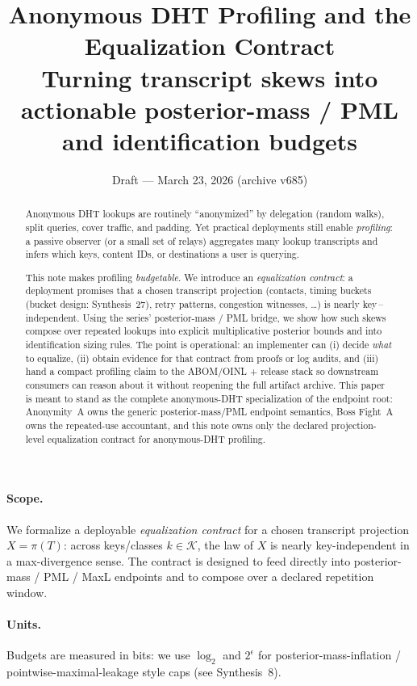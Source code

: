\documentclass[11pt]{article}
\title{Anonymous DHT Profiling and the Equalization Contract\\
\large Turning transcript skews into actionable posterior-mass / PML and identification budgets}
\author{}
\date{Draft --- March 23, 2026 (archive v685)}
\begin{document}
\maketitle

\begin{abstract}
Anonymous DHT lookups are routinely ``anonymized'' by delegation (random walks), split queries, cover traffic, and padding.
Yet practical deployments still enable \emph{profiling}: a passive observer (or a small set of relays) aggregates many lookup transcripts and infers which keys, content IDs, or destinations a user is querying.

This note makes profiling \emph{budgetable}.
We introduce an \emph{equalization contract}: a deployment promises that a chosen transcript projection (contacts, timing buckets (bucket design: Synthesis~27)\cite{series:bucketdesign}, retry patterns, congestion witnesses, \dots) is nearly key\,--\,independent.
Using the series' posterior-mass / PML bridge, we show how such skews compose over repeated lookups into explicit multiplicative posterior bounds and into identification sizing rules.
The point is operational: an implementer can (i) decide \emph{what} to equalize, (ii) obtain evidence for that contract from proofs or log audits, and (iii) hand a compact profiling claim to the ABOM/OINL + release stack so downstream consumers can reason about it without reopening the full artifact archive.
This paper is meant to stand as the complete anonymous-DHT specialization of the endpoint root: Anonymity~A owns the generic posterior-mass/PML endpoint semantics, Boss Fight~A owns the repeated-use accountant, and this note owns only the declared projection-level equalization contract for anonymous-DHT profiling.
\end{abstract}


\paragraph{Scope.}
We formalize a deployable \emph{equalization contract} for a chosen transcript projection $X=\pi(T)$:
across keys/classes $k\in\mathcal K$, the law of $X$ is nearly key-independent in a max-divergence sense.
The contract is designed to feed directly into posterior-mass / PML / MaxL endpoints and to compose over a declared repetition window.

\paragraph{Units.} Budgets are measured in bits: we use $\log_2$ and $2^{\epsilon}$ for posterior-mass-inflation / pointwise-maximal-leakage style caps (see Synthesis~8).\cite{series:notation}
\end{document}
